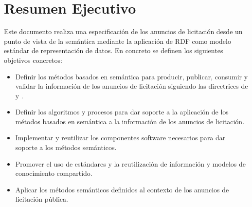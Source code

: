 \chapter*{Resumen Ejecutivo}
\thispagestyle{empty}
Este documento realiza una especificación de los anuncios de licitación desde un punto de 
vista de la semántica mediante la aplicación de RDF como modelo estándar de representación 
de datos. En concreto se definen los siguientes objetivos concretos:

\begin{itemize}
\item Definir los métodos basados en semántica para producir, publicar, consumir y validar 
la información de los anuncios de licitación siguiendo las directrices de \opendata y \linkeddata. %
 \item Definir los algoritmos y procesos para dar soporte a la aplicación de los métodos basados en semántica 
a la información de los anuncios de licitación. %
\item Implementar y reutilizar los componentes software necesarios para dar soporte a los métodos semánticos.%
\item Promover el uso de estándares y la reutilización de información y modelos de conocimiento compartido.%
\item Aplicar los métodos semánticos definidos al contexto de los anuncios de licitación pública.%
\end{itemize}




